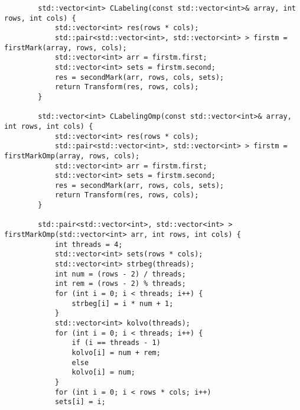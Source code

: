\documentclass{report}
\begin{document}
\begin{lstlisting}
	    std::vector<int> CLabeling(const std::vector<int>& array, int rows, int cols) {
	    	std::vector<int> res(rows * cols);
	    	std::pair<std::vector<int>, std::vector<int> > firstm = firstMark(array, rows, cols);
	    	std::vector<int> arr = firstm.first;
	    	std::vector<int> sets = firstm.second;
	    	res = secondMark(arr, rows, cols, sets);
	    	return Transform(res, rows, cols);
	    }
	    
	    std::vector<int> CLabelingOmp(const std::vector<int>& array, int rows, int cols) {
	    	std::vector<int> res(rows * cols);
	    	std::pair<std::vector<int>, std::vector<int> > firstm = firstMarkOmp(array, rows, cols);
	    	std::vector<int> arr = firstm.first;
	    	std::vector<int> sets = firstm.second;
	    	res = secondMark(arr, rows, cols, sets);
	    	return Transform(res, rows, cols);
	    }
	    
	    std::pair<std::vector<int>, std::vector<int> > firstMarkOmp(std::vector<int> arr, int rows, int cols) {
	    	int threads = 4;
	    	std::vector<int> sets(rows * cols);
	    	std::vector<int> strbeg(threads);
	    	int num = (rows - 2) / threads;
	    	int rem = (rows - 2) % threads;
	    	for (int i = 0; i < threads; i++) {
	    		strbeg[i] = i * num + 1;
	    	}
	    	std::vector<int> kolvo(threads);
	    	for (int i = 0; i < threads; i++) {
	    		if (i == threads - 1)
	    		kolvo[i] = num + rem;
	    		else
	    		kolvo[i] = num;
	    	}
	    	for (int i = 0; i < rows * cols; i++)
	    	sets[i] = i;
	    	

\end{lstlisting}
\end{document}
